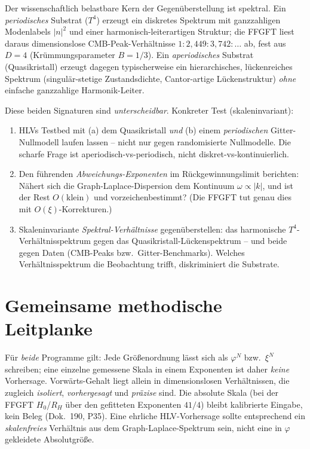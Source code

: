 Der wissenschaftlich belastbare Kern der Gegenüberstellung ist spektral. Ein \emph{periodisches}
Substrat ($T^4$) erzeugt ein diskretes Spektrum mit ganzzahligen Modenlabels $|n|^2$ und einer
harmonisch-leiterartigen Struktur; die FFGFT liest daraus dimensionslose CMB-Peak-Verhältnisse
$1 : 2{,}449 : 3{,}742 : \dots$ ab, fest aus $D=4$ (Krümmungsparameter $B=1/3$). Ein
\emph{aperiodisches} Substrat (Quasikristall) erzeugt dagegen typischerweise ein hierarchisches,
lückenreiches Spektrum (singulär-stetige Zustandsdichte, Cantor-artige Lückenstruktur) \emph{ohne}
einfache ganzzahlige Harmonik-Leiter.

Diese beiden Signaturen sind \emph{unterscheidbar}. Konkreter Test (skaleninvariant):
\begin{enumerate}
\item HLVs Testbed mit (a) dem Quasikristall \emph{und} (b) einem \emph{periodischen} Gitter-Nullmodell
laufen lassen -- nicht nur gegen randomisierte Nullmodelle. Die scharfe Frage ist
aperiodisch-vs-periodisch, nicht diskret-vs-kontinuierlich.
\item Den führenden \emph{Abweichungs-Exponenten} im Rückgewinnungslimit berichten: Nähert sich die
Graph-Laplace-Dispersion dem Kontinuum $\omega\propto|k|$, und ist der Rest $O(\text{klein})$ und
vorzeichenbestimmt? (Die FFGFT tut genau dies mit $O(\xi)$-Korrekturen.)
\item Skaleninvariante \emph{Spektral-Verhältnisse} gegenüberstellen: das harmonische
$T^4$-Verhältnisspektrum gegen das Quasikristall-Lückenspektrum -- und beide gegen Daten
(CMB-Peaks bzw.\ Gitter-Benchmarks). Welches Verhältnisspektrum die Beobachtung trifft,
diskriminiert die Substrate.
\end{enumerate}

\section{Gemeinsame methodische Leitplanke}

Für \emph{beide} Programme gilt: Jede Größenordnung lässt sich als $\varphi^{N}$ bzw.\ $\xi^{N}$
schreiben; eine einzelne gemessene Skala in einem Exponenten ist daher \emph{keine} Vorhersage.
Vorwärts-Gehalt liegt allein in dimensionslosen Verhältnissen, die zugleich \emph{isoliert},
\emph{vorhergesagt} und \emph{präzise} sind. Die absolute Skala (bei der FFGFT $H_0$/$R_H$ über den
gefitteten Exponenten $41/4$) bleibt kalibrierte Eingabe, kein Beleg (Dok.~190, P35). Eine
ehrliche HLV-Vorhersage sollte entsprechend ein \emph{skalenfreies} Verhältnis aus dem
Graph-Laplace-Spektrum sein, nicht eine in $\varphi$ gekleidete Absolutgröße.

